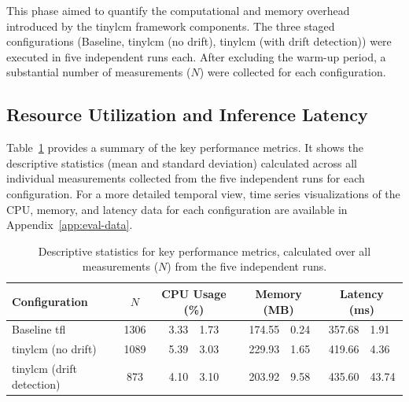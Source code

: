 This phase aimed to quantify the computational and memory overhead introduced by the \gls{tinylcm} framework components. The three staged configurations (Baseline, \gls{tinylcm} (no drift), \gls{tinylcm} (with drift detection)) were executed in five independent runs each. After excluding the warm-up period, a substantial number of measurements ($N$) were collected for each configuration.


\subsection{Resource Utilization and Inference Latency}
\label{ssec:phase1_combined_analysis_latency}

Table~\ref{tab:performance_summary_values_eval} provides a summary of the key performance metrics. It shows the descriptive statistics (mean and standard deviation) calculated across all individual measurements collected from the five independent runs for each configuration. For a more detailed temporal view, time series visualizations of the CPU, memory, and latency data for each configuration are available in Appendix~\ref{app:eval-data}.

\begin{table}[htbp]
    \centering
    \caption[Descriptive Statistics of Performance Metrics from All Measurements (Phase 1)]{Descriptive statistics for key performance metrics, calculated over all measurements ($N$) from the five independent runs.}
    \label{tab:performance_summary_values_eval}
    \footnotesize
    \begin{tabularx}{\linewidth}{@{}X c r@{$\pm$}l r@{$\pm$}l r@{$\pm$}l@{}}
        \toprule
        \textbf{Configuration} & \textbf{$N$} & \multicolumn{2}{c}{CPU Usage (\%)} & \multicolumn{2}{c}{Memory (MB)} & \multicolumn{2}{c}{Latency (ms)} \\
        \midrule
        Baseline \gls{tfl} & 1306 & 3.33 & 1.73 & 174.55 & 0.24 & 357.68 & 1.91 \\
        \gls{tinylcm} (no drift) & 1089 & 5.39 & 3.03 & 229.93 & 1.65 & 419.66 & 4.36 \\
        \gls{tinylcm} (drift detection) & 873 & 4.10 & 3.10 & 203.92 & 9.58 & 435.60 & 43.74 \\
        \bottomrule
    \end{tabularx}
\end{table}

